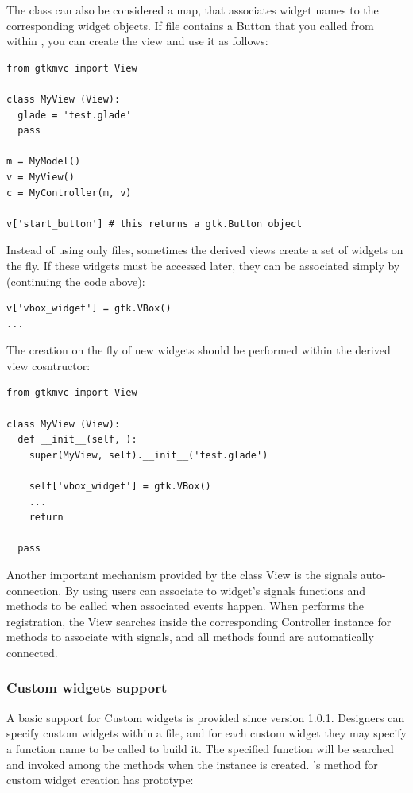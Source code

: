 The  class can also be considered a map, that
associates widget names to the corresponding widget objects. If file
 contains a Button that you called
 from within \glade, you can create the view
and use it as follows:

{ \codesize 
\begin{verbatim}
from gtkmvc import View

class MyView (View):
  glade = 'test.glade'
  pass 

m = MyModel()
v = MyView()
c = MyController(m, v)

v['start_button'] # this returns a gtk.Button object
\end{verbatim}
}

Instead of using only \glade files, sometimes the derived views create
a set of widgets on the fly. If these widgets must be accessed later,
they can be associated simply by (continuing the code above):

{ \codesize 
\begin{verbatim}
v['vbox_widget'] = gtk.VBox()
...
\end{verbatim}
}

The creation on the fly of new widgets should be performed within
the derived view cosntructor:

{ \codesize 
\begin{verbatim}
from gtkmvc import View

class MyView (View):
  def __init__(self, ):
    super(MyView, self).__init__('test.glade')

    self['vbox_widget'] = gtk.VBox()
    ...
    return

  pass 
\end{verbatim}
}


Another important mechanism provided by the class View is the signals
auto-connection. By using \glade users can associate to widget's
signals functions and methods to be called when associated events
happen.  When performs the registration, the View searches inside the
corresponding Controller instance for methods to associate with
signals, and all methods found are automatically connected.


\subsubsection{Custom widgets support}
A basic support for Custom widgets is provided since version 1.0.1.
Designers can specify custom widgets within a \glade file, and for
each custom widget they may specify a function name to be called to
build it. The specified function will be searched and invoked among
the  methods when the instance is
created. 's method for custom widget creation
has prototype:

